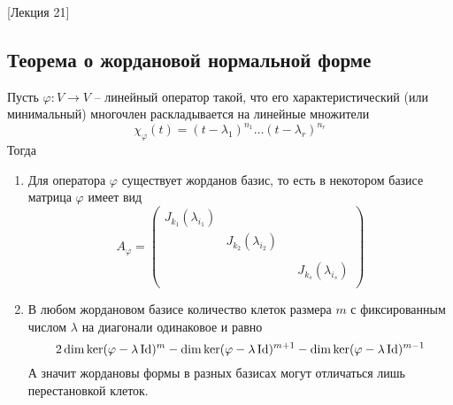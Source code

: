 [Лекция 21]


\subsection{Теорема о жордановой нормальной форме}

\begin{claim}
\label{claim::JNF}
Пусть $\varphi\colon V\to V$ -- линейный оператор такой, что его характеристический (или минимальный) многочлен раскладывается на линейные множители
\[
\chi_\varphi(t) = (t - \lambda_1)^{n_1} \ldots (t - \lambda_r)^{n_r}
\]
Тогда
\begin{enumerate}
\item Для оператора $\varphi$ существует жорданов базис, то есть в некотором базисе матрица $\varphi$ имеет вид
\[
A_\varphi = 
\begin{pmatrix}
{J_{k_1}(\lambda_{i_1})}&{}&{}&{}\\
{}&{J_{k_2}(\lambda_{i_2})}&{}&{}\\
{}&{}&{}&{}\\
{}&{}&{}&{J_{k_s}(\lambda_{i_s})}\\
\end{pmatrix}
\]

\item В любом жордановом базисе количество клеток размера $m$ с фиксированным числом $\lambda$ на диагонали одинаковое и равно
\[
2\dim \ker (\varphi - \lambda\operatorname{Id})^m - \dim \ker (\varphi - \lambda\operatorname{Id})^{m+1} - \dim \ker (\varphi - \lambda\operatorname{Id})^{m-1}
\]
А значит жордановы формы в разных базисах могут отличаться лишь перестановкой клеток.
\end{enumerate}
\end{claim}

